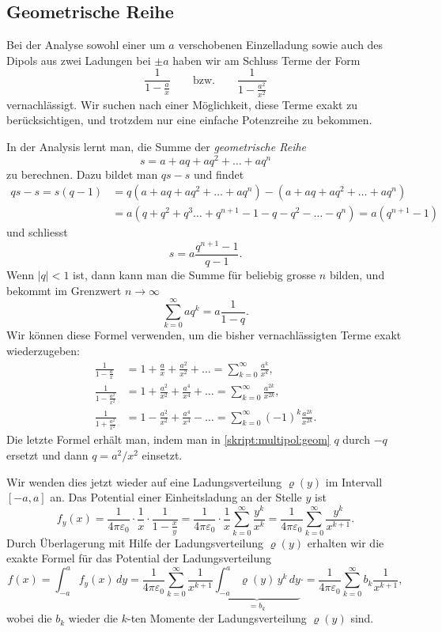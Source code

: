 \subsection{Geometrische Reihe%
\label{skript:multipol:section:geometrischereihe}}
Bei der Analyse sowohl einer um $a$ verschobenen Einzelladung sowie auch
des Dipols aus zwei Ladungen bei $\pm a$ haben wir am Schluss Terme der
Form
\[
\frac1{1-\displaystyle\frac{a}{x}}
\qquad\text{bzw.}\qquad
\frac1{1-\displaystyle\frac{a^2}{x^2}}
\]
vernachlässigt.
Wir suchen nach einer Möglichkeit, diese Terme exakt zu berücksichtigen,
und trotzdem nur eine einfache Potenzreihe zu bekommen.

In der Analysis lernt man, die Summe der {\em geometrische Reihe}
\[
s=a+aq+aq^2+\dots + aq^n
\]
zu berechnen.
Dazu bildet man $qs - s$ und findet
\begin{align*}
qs-s
=
s(q-1)
&=
q(a+aq+aq^2+\dots + aq^n)-(a+aq+aq^2+\dots + aq^n)
\\
&=
a(q+q^2+q^3\dots+q^{n+1}-1-q-q^2-\dots-q^n)
=
a(q^{n+1}-1)
\end{align*}
und schliesst
\[
s=a\frac{q^{n+1}-1}{q-1}.
\]
Wenn $|q|<1$ ist, dann kann man die Summe für beliebig grosse $n$ bilden,
und bekommt im Grenzwert $n\to\infty$
\begin{equation}
\sum_{k=0}^\infty aq^k = a\frac{1}{1-q}.
\label{skript:multipol:geom}
\end{equation}
Wir können diese Formel verwenden, um die bisher vernachlässigten Terme
exakt wiederzugeben:
\begin{align*}
\frac{1}{1-\displaystyle\frac{a}{x}}
&=
1+\frac{a}{x}+\frac{a^2}{x^2}+\dots
=
\sum_{k=0}^\infty \frac{a^k}{x^k},
\\
\frac{1}{1-\displaystyle\frac{a^2}{x^2}}
&=
1+\frac{a^2}{x^2}+\frac{a^4}{x^4}+\dots
=
\sum_{k=0}^\infty \frac{a^{2k}}{x^{2k}},
\\
\frac{1}{1+\displaystyle\frac{a^2}{x^2}}
&=
1-\frac{a^2}{x^2}+\frac{a^4}{x^4}-\dots
=
\sum_{k=0}^\infty (-1)^k\frac{a^{2k}}{x^{2k}}.
\end{align*}
Die letzte Formel erhält man, indem man in \eqref{skript:multipol:geom}
$q$ durch $-q$ ersetzt und dann $q=a^2/x^2$ einsetzt.

Wir wenden dies jetzt wieder auf eine Ladungsverteilung
$\varrho(y)$ im Intervall $[-a,a]$ an.
Das Potential einer Einheitsladung an der Stelle $y$ ist
\[
f_y(x)
=
\frac1{4\pi\varepsilon_0}\cdot \frac{1}{x}\cdot\frac{1}{1-\displaystyle\frac{x}{y}}
=
\frac1{4\pi\varepsilon_0}\cdot \frac{1}{x}
\sum_{k=0}^\infty \frac{y^k}{x^k}
=
\frac1{4\pi\varepsilon_0}
\sum_{k=0}^\infty \frac{y^k}{x^{k+1}}.
\]
Durch Überlagerung mit Hilfe der Ladungsverteilung $\varrho(y)$ 
erhalten wir die exakte Formel für das Potential der Ladungsverteilung
\begin{equation}
f(x)
=
\int_{-a}^af_y(x)\,dy
=
\frac{1}{4\pi\varepsilon_0}
\sum_{k=0}^\infty
\frac{1}{x^{k+1}}
\underbrace{\int_{-a}^a\varrho(y)\,y^k\,dy}_{\displaystyle =b_k}
\cdot
=
\frac{1}{4\pi\varepsilon_0}
\sum_{k=0}^\infty b_k
\frac{1}{x^{k+1}},
\label{skript:multipol:reiheexakte}
\end{equation}
wobei die $b_k$ wieder die $k$-ten Momente der Ladungsverteilung
$\varrho(y)$ sind.


